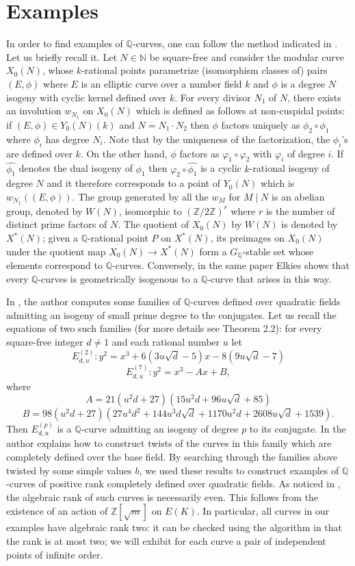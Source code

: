 \documentclass[11pt]{amsart}
\theoremstyle{definition}
\begin{document}
		\section{Examples}\label{exs}
		In order to find examples of ${\mathbb{Q}}$-curves, one can follow the method indicated in \cite{elk}. Let us briefly recall it. Let $N\in {\mathbb{N}}$ be square-free and consider the modular curve $X_0(N)$, whose $k$-rational points parametrize (isomorphism classes of) pairs $(E,\phi)$ where $E$ is an elliptic curve over a number field $k$ and $\phi$ is a degree $N$ isogeny with cyclic kernel defined over $k$. For every divisor $N_1$ of $N$, there exists an involution $w_{N_1}$ on $X_0(N)$ which is defined as follows at non-cuspidal points: if $(E,\phi)\in Y_0(N)(k)$ and $N=N_1\cdot N_2$ then $\phi$ factors uniquely as $\phi_2\circ\phi_1$ where $\phi_i$ has degree $N_i$. Note that by the uniqueness of the factorization, the $\phi_i$'s are defined over $k$. On the other hand, $\phi$ factors as $\varphi_1\circ\varphi_2$ with $\varphi_i$ of degree $i$. If $\widehat{\phi_1}$ denotes the dual isogeny of $\phi_1$ then $\varphi_2\circ\widehat{\phi_1}$ is a cyclic $k$-rational isogeny of degree $N$ and it therefore corresponds to a point of $Y_0(N)$ which is $w_{N_1}((E,\phi))$. The group generated by all the $w_{M}$ for $M\mid N$ is an abelian group, denoted by $W(N)$, isomorphic to $({\mathbb{Z}}/2{\mathbb{Z}})^r$ where $r$ is the number of distinct prime factors of $N$. The quotient of $X_0(N)$ by $W(N)$ is denoted by $X^*(N)$; given a ${\mathbb{Q}}$-rational point $P$ on $X^*(N)$, its preimages on $X_0(N)$ under the quotient map $X_0(N)\to X^*(N)$ form a $G_{\mathbb{Q}}$-stable set whose elements correspond to ${\mathbb{Q}}$-curves. Conversely, in the same paper Elkies shows that every ${\mathbb{Q}}$-curves is geometrically isogenous to a ${\mathbb{Q}}$-curve that arises in this way.

		In \cite{has}, the author computes some families of ${\mathbb{Q}}$-curves defined over quadratic fields admitting an isogeny of small prime degree to the conjugates. Let us recall the equations of two such families (for more details see Theorem 2.2): for every square-free integer $d\neq 1$ and each rational number $u$ let
		$$E_{d,u}^{(2)}\colon y^2=x^3+6(3u\sqrt{d}-5)x-8(9u\sqrt{d}-7)$$
		$$E_{d,u}^{(7)}\colon y^2=x^3-Ax+B,$$
		where
		$$A=21(u^2d+27)(15u^2d+96u\sqrt{d}+85)$$
		$$B=98(u^2d+27)(27u^4d^2+144u^3d\sqrt{d}+1170u^2d+2608u\sqrt{d}+1539).$$
		Then $E_{d,u}^{(p)}$ is a ${\mathbb{Q}}$-curve admitting an isogeny of degree $p$ to its conjugate. In \cite[Corollary 4.3]{has} the author explains how to construct twists of the curves in this family which are completely defined over the base field. By searching through the families above twisted by some simple values $b$, we used these results to construct examples of ${\mathbb{Q}}$-curves of positive rank completely defined over quadratic fields. As noticed in \cite{bru}, the algebraic rank of such curves is necessarily even. This follows from the existence of an action of ${\mathbb{Z}}[\sqrt{m}]$ on $E(K)$. In particular, all curves in our examples have algebraic rank two: it can be checked using the algorithm in \cite{sim} that the rank is at most two; we will exhibit for each curve a pair of independent points of infinite order.
\end{document}
